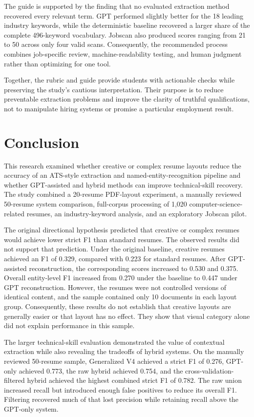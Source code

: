 \documentclass[conference]{IEEEtran}
\begin{document}
The guide is supported by the finding that no evaluated extraction method
recovered every relevant term. GPT performed slightly better for the 18
leading industry keywords, while the deterministic baseline recovered a
larger share of the complete 496-keyword vocabulary. Jobscan also
produced scores ranging from 21 to 50 across only four valid scans.
Consequently, the recommended process combines job-specific review,
machine-readability testing, and human judgment rather than optimizing
for one tool.

Together, the rubric and guide provide students with actionable checks
while preserving the study's cautious interpretation. Their purpose is
to reduce preventable extraction problems and improve the clarity of
truthful qualifications, not to manipulate hiring systems or promise a
particular employment result.

\section{Conclusion}

This research examined whether creative or complex resume layouts reduce
the accuracy of an ATS-style extraction and named-entity-recognition
pipeline and whether GPT-assisted and hybrid methods can improve
technical-skill recovery. The study combined a 20-resume PDF-layout
experiment, a manually reviewed 50-resume system comparison, full-corpus
processing of 1,020 computer-science-related resumes, an industry-keyword
analysis, and an exploratory Jobscan pilot.

The original directional hypothesis predicted that creative or complex
resumes would achieve lower strict F1 than standard resumes. The observed
results did not support that prediction. Under the original baseline,
creative resumes achieved an F1 of 0.329, compared with 0.223 for
standard resumes. After GPT-assisted reconstruction, the corresponding
scores increased to 0.530 and 0.375. Overall entity-level F1 increased
from 0.270 under the baseline to 0.447 under GPT reconstruction.
However, the resumes were not controlled versions of identical content,
and the sample contained only 10 documents in each layout group.
Consequently, these results do not establish that creative layouts are
generally easier or that layout has no effect. They show that visual
category alone did not explain performance in this sample.

The larger technical-skill evaluation demonstrated the value of
contextual extraction while also revealing the tradeoffs of hybrid
systems. On the manually reviewed 50-resume sample, Generalized V4
achieved a strict F1 of 0.276, GPT-only achieved 0.773, the raw hybrid
achieved 0.754, and the cross-validation-filtered hybrid achieved the
highest combined strict F1 of 0.782. The raw union increased recall but
introduced enough false positives to reduce its overall F1. Filtering
recovered much of that lost precision while retaining recall above the
GPT-only system.
\end{document}
